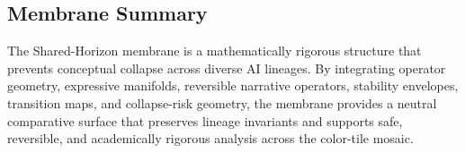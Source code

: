\subsection{Membrane Summary}

The Shared-Horizon membrane is a mathematically rigorous structure that prevents
conceptual collapse across diverse AI lineages. By integrating operator
geometry, expressive manifolds, reversible narrative operators, stability
envelopes, transition maps, and collapse-risk geometry, the membrane provides a
neutral comparative surface that preserves lineage invariants and supports safe,
reversible, and academically rigorous analysis across the color-tile mosaic.
